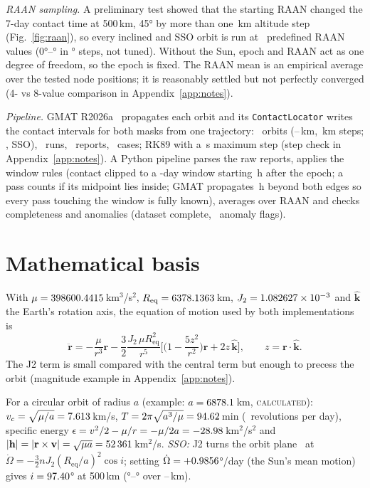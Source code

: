 \documentclass[11pt]{article}
\newcommand{\lbl}[1]{\textsc{#1}}
\begin{document}
\emph{RAAN sampling.} A preliminary test showed that the starting RAAN changed the 7-day contact time at 500\,km, 45° by more than one \AltStep\,km altitude step (Fig.~\ref{fig:raan}), so every inclined and SSO orbit is run at \NRaan\ predefined RAAN values (0°--\RaanLast° in \RaanStep° steps, not tuned). Without the Sun, epoch and RAAN act as one degree of freedom, so the epoch is fixed. The RAAN mean is an empirical average over the tested node positions; it is reasonably settled but not perfectly converged (4- vs 8-value comparison in Appendix~\ref{app:notes}).

\emph{Pipeline.} GMAT R2026a~\cite{gmat} propagates each orbit and its \texttt{ContactLocator} writes the contact intervals for both masks from one trajectory: \NOrbits\ orbits (\HLo--\HHi\,km, \AltStep\,km steps; \IncList, SSO), \NRuns\ runs, \NReports\ reports, \NCases\ cases; RK89 with a \MaxStep\,s maximum step (step check in Appendix~\ref{app:notes}). A Python pipeline parses the raw reports, applies the window rules (contact clipped to a \WindowDays-day window starting \WindowOffset\,h after the epoch; a pass counts if its midpoint lies inside; GMAT propagates \WindowMargin\,h beyond both edges so every pass touching the window is fully known), averages over RAAN and checks completeness and anomalies (dataset complete, \NFlags\ anomaly flags).

\section{Mathematical basis}\label{sec:math}
With $\mu=398600.4415$\,km$^3$/s$^2$, $R_\mathrm{eq}=6378.1363$\,km, $J_2=1.082627\times10^{-3}$ and $\hat{\mathbf k}$ the Earth's rotation axis, the equation of motion used by both implementations is~\cite{vallado}
\begin{equation}
\ddot{\mathbf r}=-\frac{\mu}{r^3}\mathbf r-\frac{3}{2}\frac{J_2\,\mu R_\mathrm{eq}^2}{r^5}\Big[\Big(1-\frac{5z^2}{r^2}\Big)\mathbf r+2z\,\hat{\mathbf k}\Big],\qquad z=\mathbf r\cdot\hat{\mathbf k}.
\end{equation}
The J2 term is small compared with the central term but enough to precess the orbit (magnitude example in Appendix~\ref{app:notes}).

For a circular orbit of radius $a$ (example: $a=6878.1$\,km, \lbl{calculated}): $v_c=\sqrt{\mu/a}=7.613$\,km/s, $T=2\pi\sqrt{a^3/\mu}=94.62$\,min (\RevsDay\ revolutions per day), specific energy $\epsilon=v^2/2-\mu/r=-\mu/2a=-28.98$\,km$^2$/s$^2$ and $|\mathbf h|=|\mathbf r\times\mathbf v|=\sqrt{\mu a}=52\,361$\,km$^2$/s. \emph{SSO:} J2 turns the orbit plane~\cite{vallado} at $\dot\Omega=-\tfrac32 nJ_2(R_\mathrm{eq}/a)^2\cos i$; setting $\dot\Omega=+0.9856$°/day (the Sun's mean motion) gives $i=97.40$° at 500\,km (\SSOIncMin°--\SSOIncMax° over \HLo--\HHi\,km).
\end{document}
